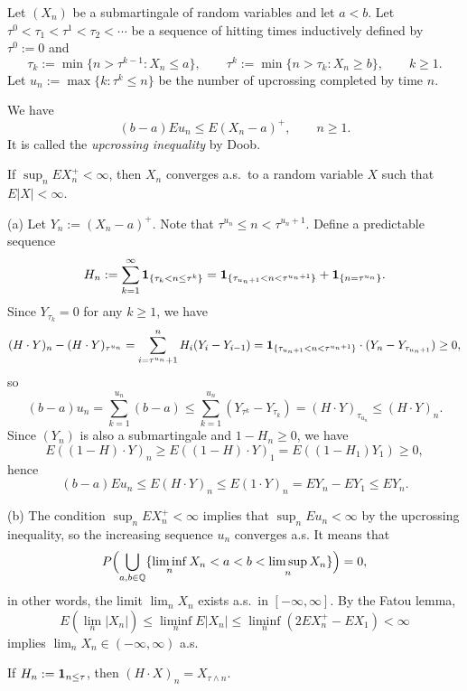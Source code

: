 \documentclass{../../large}
\begin{document}
\begin{prb}
Let $(X_n)$ be a submartingale of random variables and let $a<b$.
Let $\tau^0<\tau_1<\tau^1<\tau_2<\cdots$ be a sequence of hitting times inductively defined by $\tau^0:=0$ and
\[\tau_k:=\min\{n>\tau^{k-1}:X_n\le a\},\qquad\tau^k:=\min\{n>\tau_k:X_n\ge b\},\qquad k\ge1.\]
Let $u_n:=\max\{k:\tau^k\le n\}$ be the number of upcrossing completed by time $n$.
\begin{parts}
\item We have
\[(b-a)Eu_n\le E(X_n-a)^+,\qquad n\ge1.\]
It is called the \emph{upcrossing inequality} by Doob.
\item If $\sup_nEX_n^+<\infty$, then $X_n$ converges a.s.~to a random variable $X$ such that $E|X|<\infty$.
\end{parts}
\end{prb}
\begin{pf}
(a)
Let $Y_n:=(X_n-a)^+$.
Note that $\tau^{u_n}\le n<\tau^{u_n+1}$.
Define a predictable sequence
\[H_n:=\sum_{k=1}^\infty\mathbf{1}_{\{\tau_k<n\le\tau^k\}}=\mathbf{1}_{\{\tau_{u_n+1}<n<\tau^{u_n+1}\}}+\mathbf{1}_{\{n=\tau^{u_n}\}}.\]
Since $Y_{\tau_k}=0$ for any $k\ge1$, we have
\[(H\cdot Y)_n-(H\cdot Y)_{\tau^{u_n}}=\sum_{i=\tau^{u_n}+1}^nH_i(Y_i-Y_{i-1})=\mathbf{1}_{\{\tau_{u_n+1}<n<\tau^{u_n+1}\}}\cdot(Y_n-Y_{\tau_{u_n+1}})\ge0,\]
so
\[(b-a)u_n=\sum_{k=1}^{u_n}(b-a)\le\sum_{k=1}^{u_n}(Y_{\tau^k}-Y_{\tau_k})=(H\cdot Y)_{\tau_{u_n}}\le(H\cdot Y)_n.\]
Since $(Y_n)$ is also a submartingale and $1-H_n\ge0$, we have
\[E((1-H)\cdot Y)_n\ge E((1-H)\cdot Y)_1=E((1-H_1)Y_1)\ge0,\]
hence
\[(b-a)Eu_n\le E(H\cdot Y)_n\le E(1\cdot Y)_n=EY_n-EY_1\le EY_n.\]

(b)
The condition $\sup_nEX_n^+<\infty$ implies that $\sup_nEu_n<\infty$ by the upcrossing inequality, so the increasing sequence $u_n$ converges a.s.
It means that
\[P\Bigl(\bigcup_{a,b\in\mathbb{Q}}\{\liminf_nX_n<a<b<\limsup_nX_n\}\Bigr)=0,\]
in other words, the limit $\lim_nX_n$ exists a.s.~in $[-\infty,\infty]$.
By the Fatou lemma,
\[E(\lim_n|X_n|)\le\liminf_nE|X_n|\le\liminf_n(2EX_n^+-EX_1)<\infty\]
implies $\lim_nX_n\in(-\infty,\infty)$ a.s.
\end{pf}

\begin{prb}
If $H_n:=\mathbf{1}_{n\le\tau}$, then $(H\cdot X)_n=X_{\tau\wedge n}$.
\begin{parts}
\item
\end{parts}
\end{prb}
\end{document}
